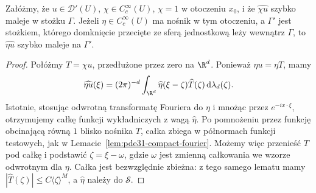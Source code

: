 \begin{lemat}\label{lem:pde31-cutoff}
Załóżmy, że $u\in\mathcal D'(U)$, $\chi\in C_c^\infty(U)$,
$\chi=1$ w otoczeniu $x_0$, i że
$\widehat{\chi u}$ szybko maleje w stożku $\Gamma$.
Jeżeli $\eta\in C_c^\infty(U)$ ma nośnik w tym otoczeniu,
a $\Gamma'$ jest stożkiem, którego domknięcie przecięte ze sferą
jednostkową leży wewnątrz $\Gamma$, to
$\widehat{\eta u}$ szybko maleje na $\Gamma'$.
\end{lemat}
\begin{proof}
Połóżmy $T=\chi u$, przedłużone przez zero na $\R^d$.
Ponieważ $\eta u=\eta T$, mamy
\[
 \widehat{\eta u}(\xi)=(2\pi)^{-d}\int_{\R^d}
 \widehat\eta(\xi-\zeta)\widehat T(\zeta)
 \,\mathrm d\lambda_d(\zeta).
\]
Istotnie, stosując odwrotną transformatę Fouriera
do $\eta$ i mnożąc przez $e^{-ix\cdot\xi}$,
otrzymujemy całkę funkcji wykładniczych z wagą
$\widehat\eta$. Po pomnożeniu przez funkcję
obcinającą równą $1$ blisko nośnika $T$,
całka zbiega w półnormach funkcji testowych,
jak w Lemacie~\ref{lem:pde31-compact-fourier}.
Możemy więc przenieść $T$ pod całkę i podstawić
$\zeta=\xi-\omega$, gdzie $\omega$ jest zmienną
całkowania we wzorze odwrotnym dla $\eta$.
Całka jest bezwzględnie zbieżna: z tego samego
lematu mamy $|\widehat T(\zeta)|\le C\langle\zeta\rangle^M$,
a $\widehat\eta$ należy do $\mathcal S$.


\end{proof}
